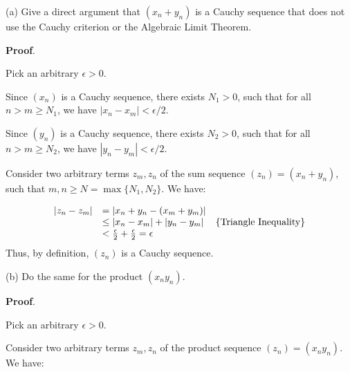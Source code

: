 \documentclass[10pt]{article}
\begin{document}
(a) Give a direct argument that $\displaystyle ( x_{n} +y_{n})$ is a Cauchy sequence that does not use the Cauchy criterion or the Algebraic Limit Theorem. 



\textbf{Proof}.



Pick an arbitrary $\displaystyle \epsilon  >0$. 



Since $\displaystyle ( x_{n})$ is a Cauchy sequence, there exists $\displaystyle N_{1}  >0$, such that for all $\displaystyle n >m\geq N_{1}$, we have $\displaystyle |x_{n} -x_{m} |< \epsilon /2$.



Since $\displaystyle ( y_{n})$ is a Cauchy sequence, there exists $\displaystyle N_{2}  >0$, such that for all $\displaystyle n >m\geq N_{2}$, we have $\displaystyle |y_{n} -y_{m} |< \epsilon /2$.



Consider two arbitrary terms $\displaystyle z_{m} ,z_{n}$ of the sum sequence $\displaystyle ( z_{n}) =( x_{n} +y_{n})$, such that $\displaystyle m,n\geq N=\max\{N_{1} ,N_{2}\}$. We have:




\begin{equation*}
\begin{array}{ c l c }
|z_{n} -z_{m} | & =|x_{n} +y_{n} -( x_{m} +y_{m}) | & \\
 & \leq |x_{n} -x_{m} |+|y_{n} -y_{m} | & \left\{\text{Triangle Inequality}\right\}\\
 & < \frac{\epsilon }{2} +\frac{\epsilon }{2} =\epsilon  & 
\end{array}
\end{equation*}
Thus, by definition, $\displaystyle ( z_{n})$ is a Cauchy sequence.



(b) Do the same for the product $\displaystyle ( x_{n} y_{n})$.



\textbf{Proof}.



Pick an arbitrary $\displaystyle \epsilon  >0$. 



Consider two arbitrary terms $\displaystyle z_{m} ,z_{n}$ of the product sequence $\displaystyle ( z_{n}) =( x_{n} y_{n})$. We have:
\end{document}
